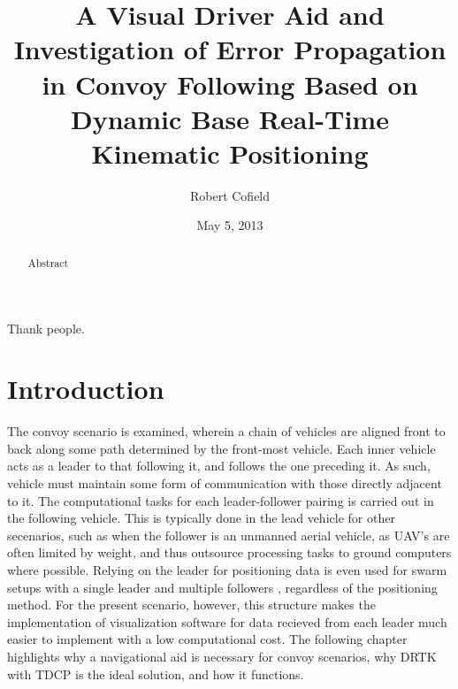 \documentclass[12pt]{report}
\title{A Visual Driver Aid and Investigation of Error Propagation in Convoy Following Based on Dynamic Base Real-Time Kinematic Positioning}
\author{Robert Cofield}
\date{May 5, 2013}
\begin{document}

\begin{romanpages}

\TitlePage

\begin{abstract}
Abstract
\end{abstract}

\begin{acknowledgments}
Thank people.
\end{acknowledgments}

\tableofcontents
\listoffigures
\listoftables

\printnomenclature[0.75in] 

\end{romanpages}

\normalem       %


\chapter{Introduction}

The convoy scenario is examined, wherein a chain of vehicles are aligned front to back along some path determined by the front-most vehicle. Each inner vehicle acts as a leader to that following it, and follows the one preceding it. As such, vehicle must maintain some form of communication with those directly adjacent to it.
The computational tasks for each leader-follower pairing is carried out in the following vehicle. This is typically done in the lead vehicle for other secenarios, such as when the follower is an unmanned aerial vehicle, as UAV's are often limited by weight, and thus outsource processing tasks to ground computers where possible. Relying on the leader for positioning data is even used for swarm setups with a single leader and multiple followers \cite{gian}, regardless of the positioning method. For the present scenario, however, this structure makes the implementation of visualization software for data recieved from each leader much easier to implement with a low computational cost. The following chapter highlights why a navigational aid is necessary for convoy scenarios, why DRTK with TDCP is the ideal solution, and how it functions.
\end{document}
